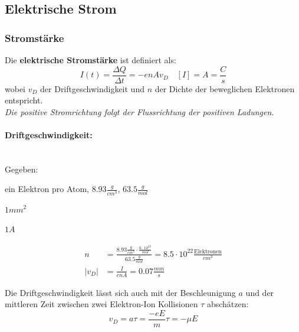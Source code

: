 \documentclass[7pt]{article}
\begin{document}
\begin{multicols*}{3}
\subsection{Elektrische Strom}

\subsubsection{Stromst{\"a}rke}

Die \textbf{elektrische Stromst{\"a}rke} ist definiert als:
\begin{equation*}
	I(t) = \frac{\Delta Q}{\Delta t} = -enAv_D \quad [I] = A = \frac{C}{s}
\end{equation*}
wobei $v_D$ der Driftgeschwindigkeit und $n$ der Dichte der beweglichen Elektronen entspricht. \\

\emph{Die positive Stromrichtung folgt der Flussrichtung der positiven Ladungen.} \\

\paragraph{Driftgeschwindigkeit:} \mbox{} \\

Gegeben:
\begin{description}[labelindent=16pt,style=multiline,leftmargin=4.2cm, noitemsep]
	\item[Kupferdraht:] ein Elektron pro Atom, $8.93 \frac{g}{cm^3}$, $63.5 \frac{g}{mol}$
	\item[Querschnittsfl{\"a}che:] $1mm^2$
	\item[Stromst{\"a}rke:] $1 A$
\end{description}

\begin{equation*}
\begin{split}
	n & = \frac{8.93 \frac{g}{cm^3} \cdot \frac{6 \cdot 10^{23}}{mol}}{63.5 \frac{g}{mol}} = 8.5 \cdot 10^{22} \frac{\text{Elektronen}}{cm^3} \\
	|v_D| & = \frac{I}{enA} = 0.07 \frac{mm}{s}
\end{split}
\end{equation*}

Die Driftgeschwindigkeit l{\"a}sst sich auch mit der Beschleunigung $a$ und der mittleren Zeit zwischen zwei Elektron-Ion Kollisionen $\tau$ absch{\"a}tzen:
\begin{equation*}
	v_D = a\tau = \frac{-eE}{m}\tau = -\mu E
\end{equation*}


\end{multicols*}
\end{document}
